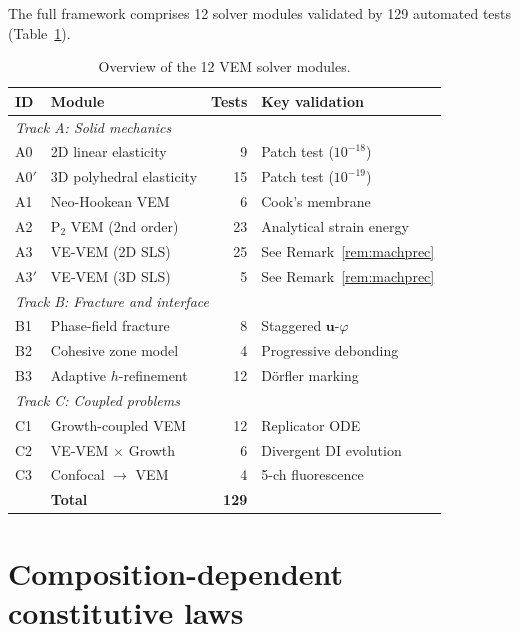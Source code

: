 \documentclass[smallextended]{svjour3}
\newcommand{\vect}[1]{\bm{#1}}
\newcommand{\pf}{\varphi}
\begin{document}
The full framework comprises 12 solver modules validated by
129 automated tests (Table~\ref{tab:modules}).

\begin{table}[t]
  \centering
  \caption{Overview of the 12 VEM solver modules.}
  \label{tab:modules}
  \begin{tabular}{llrl}
    \toprule
    ID & Module & Tests & Key validation \\
    \midrule
    \multicolumn{4}{l}{\textit{Track A: Solid mechanics}} \\
    A0 & 2D linear elasticity & 9 & Patch test ($10^{-18}$) \\
    A0$'$ & 3D polyhedral elasticity & 15 & Patch test ($10^{-19}$) \\
    A1 & Neo-Hookean VEM & 6 & Cook's membrane \\
    A2 & P$_2$ VEM (2nd order) & 23 & Analytical strain energy \\
    A3 & VE-VEM (2D SLS) & 25 & See Remark~\ref{rem:machprec} \\
    A3$'$ & VE-VEM (3D SLS) & 5 & See Remark~\ref{rem:machprec} \\
    \midrule
    \multicolumn{4}{l}{\textit{Track B: Fracture and interface}} \\
    B1 & Phase-field fracture & 8 & Staggered $\vect{u}$-$\pf$ \\
    B2 & Cohesive zone model & 4 & Progressive debonding \\
    B3 & Adaptive $h$-refinement & 12 & D\"orfler marking \\
    \midrule
    \multicolumn{4}{l}{\textit{Track C: Coupled problems}} \\
    C1 & Growth-coupled VEM & 12 & Replicator ODE \\
    C2 & VE-VEM $\times$ Growth & 6 & Divergent DI evolution \\
    C3 & Confocal $\to$ VEM & 4 & 5-ch fluorescence \\
    \midrule
    & \textbf{Total} & \textbf{129} & \\
    \bottomrule
  \end{tabular}
\end{table}

\section{Composition-dependent constitutive laws}
\label{sec:constitutive}
\end{document}
